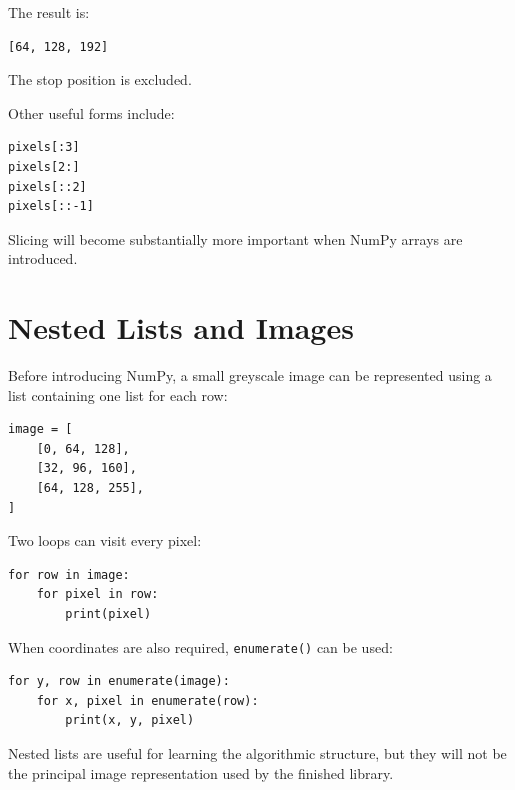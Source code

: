 The result is:

\begin{verbatim}
[64, 128, 192]
\end{verbatim}

The stop position is excluded.

Other useful forms include:

\begin{verbatim}
pixels[:3]
pixels[2:]
pixels[::2]
pixels[::-1]
\end{verbatim}

Slicing will become substantially more important when NumPy arrays
are introduced.


\section{Nested Lists and Images}
\label{sec:nested-lists}

Before introducing NumPy, a small greyscale image can be represented
using a list containing one list for each row:

\begin{listing}[htbp]
    \caption{A small image represented using nested Python lists.}
    \label{lst:nested-list-image}

\begin{verbatim}
image = [
    [0, 64, 128],
    [32, 96, 160],
    [64, 128, 255],
]
\end{verbatim}

\end{listing}

Two loops can visit every pixel:

\begin{verbatim}
for row in image:
    for pixel in row:
        print(pixel)
\end{verbatim}

When coordinates are also required,
\texttt{enumerate()} can be used:

\begin{verbatim}
for y, row in enumerate(image):
    for x, pixel in enumerate(row):
        print(x, y, pixel)
\end{verbatim}

Nested lists are useful for learning the algorithmic structure, but
they will not be the principal image representation used by the
finished library.


